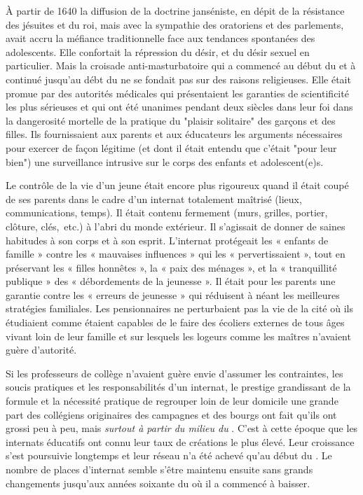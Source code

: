   À partir de 1640 la diffusion de la doctrine janséniste, en dépit de la résistance des jésuites et du roi, mais avec la sympathie des oratoriens et des parlements, avait accru la méfiance traditionnelle face aux tendances spontanées des adolescents. Elle confortait la répression du désir, et du désir sexuel en particulier. Mais la croisade anti-masturbatoire qui a commencé au début du  et à continué jusqu'au débt du  ne se fondait pas sur des raisons religieuses. Elle était promue par des autorités médicales qui présentaient les garanties de scientificité les plus sérieuses et qui ont été unanimes pendant deux siècles dans leur foi dans la dangerosité mortelle de la pratique du "plaisir solitaire" des garçons et des filles. Ils fournissaient aux parents et aux éducateurs les arguments nécessaires pour exercer de façon légitime (et dont il était entendu que c'était "pour leur bien") une surveillance intrusive sur le corps des enfants et adolescent(e)s. 
  
  Le contrôle de la vie d'un jeune était encore plus rigoureux quand il était coupé de ses parents dans le cadre d'un internat totalement maîtrisé (lieux, communications, temps). Il était contenu fermement (murs, grilles, portier, clôture, clés,~etc.) à l'abri du monde extérieur. Il s'agissait de donner de saines habitudes à son corps et à son esprit.  L'internat protégeait les « enfants de famille » contre les « mauvaises influences » qui les « pervertissaient », tout en préservant les « filles honnêtes », la « paix des ménages », et la « tranquillité publique » des « débordements de la jeunesse ». Il était pour les parents une garantie contre les « erreurs de jeunesse » qui réduisent à néant les meilleures stratégies familiales. Les pensionnaires ne perturbaient pas la vie de la cité où ils étudiaient comme étaient capables de le faire des écoliers externes de tous âges vivant loin de leur famille et sur lesquels les logeurs comme les maîtres n'avaient guère d'autorité. 
  
  Si les professeurs de collège n'avaient guère envie d'assumer les contraintes, les soucis pratiques et les responsabilités d'un internat, le prestige grandissant de la formule et la nécessité pratique de regrouper loin de leur domicile une grande part des collégiens originaires des campagnes et des bourgs  ont fait qu'ils ont grossi peu à peu, mais \emph{surtout à partir du milieu du }. C'est à cette époque que les internats éducatifs ont connu leur taux de créations le plus élevé. Leur croissance s'est poursuivie longtemps et leur réseau n'a été achevé qu'au début du . Le nombre de places d'internat semble s'être maintenu ensuite sans grands changements jusqu'aux années soixante du  où il a commencé à baisser.
 
 
 
  




